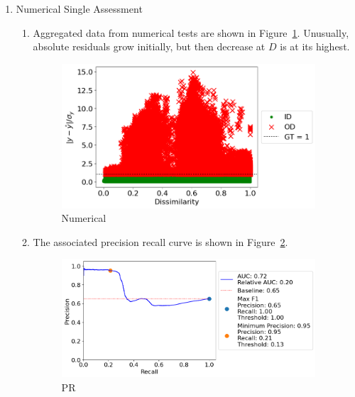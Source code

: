 \begin{enumerate}
\begin{enumerate}
    \end{enumerate}

    \item Numerical Single Assessment

    \begin{enumerate}

        \item Aggregated data from numerical tests are shown in Figure~\ref{cond_single}. Unusually, absolute residuals grow initially, but then decrease at $D$ is at its highest.

        \begin{figure}[H]
        \centering
        \includegraphics[width=0.95\textwidth]{figures/cond_single.png}
        \caption{Numerical}
        \label{cond_single}
        \end{figure}

        \item The associated precision recall curve is shown in Figure~\ref{cond_single_pr}.

        \begin{figure}[H]
        \centering
        \includegraphics[width=0.95\textwidth]{figures/cond_single_pr.png}
        \caption{PR}
        \label{cond_single_pr}
        \end{figure}
    \end{enumerate}


\end{enumerate}
